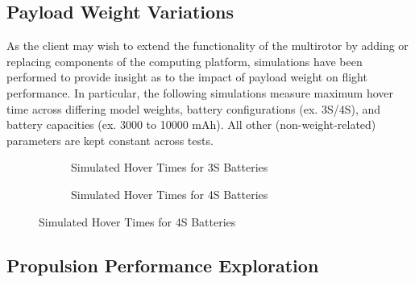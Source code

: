 \subsection{Payload Weight Variations}
As the client may wish to extend the functionality of the multirotor by adding or replacing components of the computing platform, simulations have been performed to provide insight as to the impact of payload weight on flight performance. In particular, the following simulations measure maximum hover time across differing model weights, battery configurations (ex. 3S/4S), and battery capacities (ex. 3000 to 10000 mAh). All other (non-weight-related) parameters are kept constant across tests.

\begin{figure}[H]
\centering
\begin{subfigure}{.5\textwidth}
\caption{Simulated Hover Times for 3S Batteries}
\end{subfigure}%
\begin{subfigure}{.5\textwidth}
\centering
{}
\caption{Simulated Hover Times for 4S Batteries}
\end{subfigure}
\end{figure}

\subsection{Propulsion Performance Exploration}
\label{prop_explore}

